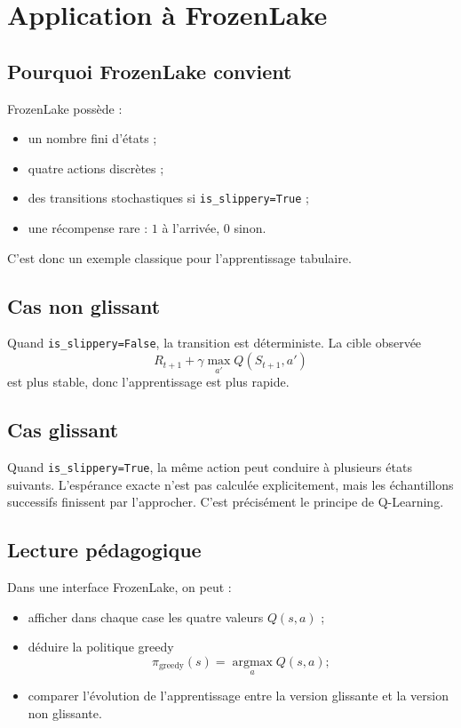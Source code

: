 \documentclass[11pt,a4paper]{article}
\newcommand{\argmax}{\operatorname*{argmax}}
\begin{document}
\section{Application à FrozenLake}

\subsection{Pourquoi FrozenLake convient}

FrozenLake possède :
\begin{itemize}[leftmargin=1.6em]
    \item un nombre fini d'états ;
    \item quatre actions discrètes ;
    \item des transitions stochastiques si \texttt{is\_slippery=True} ;
    \item une récompense rare : $1$ à l'arrivée, $0$ sinon.
\end{itemize}
C'est donc un exemple classique pour l'apprentissage tabulaire.

\subsection{Cas non glissant}

Quand \texttt{is\_slippery=False}, la transition est déterministe. La cible observée
\[
R_{t+1}+\gamma \max_{a'}Q(S_{t+1},a')
\]
est plus stable, donc l'apprentissage est plus rapide.

\subsection{Cas glissant}

Quand \texttt{is\_slippery=True}, la même action peut conduire à plusieurs états suivants. L'espérance exacte n'est pas calculée explicitement, mais les échantillons successifs finissent par l'approcher. C'est précisément le principe de Q-Learning.

\subsection{Lecture pédagogique}

Dans une interface FrozenLake, on peut :
\begin{itemize}[leftmargin=1.6em]
    \item afficher dans chaque case les quatre valeurs $Q(s,a)$ ;
    \item déduire la politique greedy
    \[
    \pi_{\text{greedy}}(s)=\argmax_a Q(s,a) ;
    \]
    \item comparer l'évolution de l'apprentissage entre la version glissante et la version non glissante.
\end{itemize}
\end{document}
